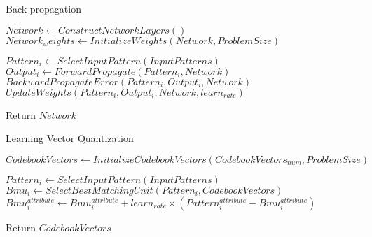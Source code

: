 \documentclass[a4paper]{article}
\begin{document}
  \begin{algorithm}
   \caption{Back-propagation  ~\cite{backpropagation12}}
    \begin{algorithmic}[1]
     \State $Network \leftarrow ConstructNetworkLayers()$
     \State $Network_weights \leftarrow InitializeWeights(Network,ProblemSize)$
    
            \State $Pattern_i \leftarrow SelectInputPattern(InputPatterns)$
            \State $Output_i \leftarrow ForwardPropagate(Pattern_i,Network)$
            \State $BackwardPropagateError(Pattern_i,Output_i,Network)$
            \State $UpdateWeights(Pattern_i,Output_i,Network,learn_{rate})$
        \EndFor
        
       
       \State Return $Network$



 

\end{algorithmic}
\end{algorithm}



  \begin{algorithm}
   \caption{Learning Vector Quantization ~\cite{learningvector3}}
    \begin{algorithmic}[1]
     \State $CodebookVectors \leftarrow InitializeCodebookVectors(CodebookVectors_{num},ProblemSize) $
     
    
            \State $Pattern_i \leftarrow SelectInputPattern(InputPatterns)$
            \State $Bmu_i \leftarrow SelectBestMatchingUnit(Pattern_i,CodebookVectors)$
            \State $Bmu_i^{attribute} \leftarrow Bmu_i^{attribute} + learn_{rate} \times (Pattern_i ^{attribute} - Bmu_i ^{attribute})  $
            \EndIf 
            \EndFor  
        \EndFor
        
       
       \State Return $CodebookVectors$



 

\end{algorithmic}
\end{algorithm}
\end{document}
